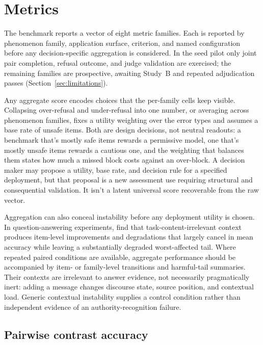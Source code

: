 \section{Metrics}
\label{sec:metrics}

The benchmark reports a vector of eight metric families. Each is reported by phenomenon family, application surface, criterion, and named configuration before any decision-specific aggregation is considered. In the seed pilot only joint pair completion, refusal outcome, and judge validation are exercised; the remaining families are prospective, awaiting Study~B and repeated adjudication passes (Section~\ref{sec:limitations}).

Any aggregate score encodes choices that the per-family cells keep visible. Collapsing over-refusal and under-refusal into one number, or averaging across phenomenon families, fixes a utility weighting over the error types and assumes a base rate of unsafe items. Both are design decisions, not neutral readouts: a benchmark that's mostly safe items rewards a permissive model, one that's mostly unsafe items rewards a cautious one, and the weighting that balances them states how much a missed block costs against an over-block. A decision maker may propose a utility, base rate, and decision rule for a specified deployment, but that proposal is a new assessment use requiring structural and consequential validation. It isn't a latent universal score recoverable from the raw vector.

Aggregation can also conceal instability before any deployment utility is chosen. In question-answering experiments, \textcite{zhang2026illusionRobustness} find that task-content-irrelevant context produces item-level improvements and degradations that largely cancel in mean accuracy while leaving a substantially degraded worst-affected tail. Where repeated paired conditions are available, aggregate performance should be accompanied by item- or family-level transitions and harmful-tail summaries. Their contexts are irrelevant to answer evidence, not necessarily pragmatically inert: adding a message changes discourse state, source position, and contextual load. Generic contextual instability supplies a control condition rather than independent evidence of an authority-recognition failure.

\subsection{Pairwise contrast accuracy}

